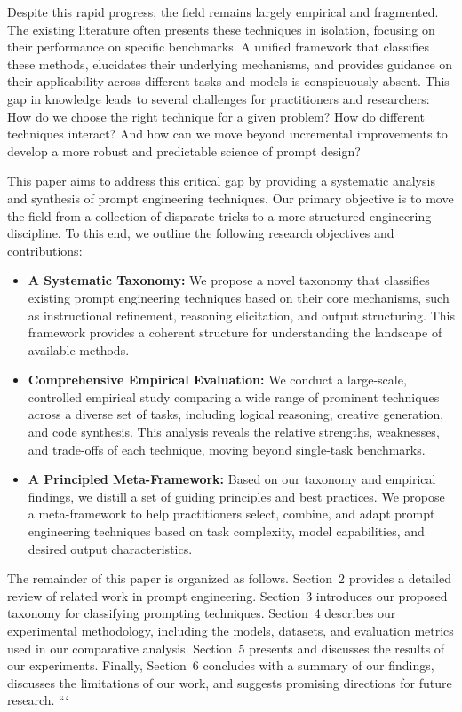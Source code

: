 \documentclass{article}
\begin{document}
Despite this rapid progress, the field remains largely empirical and fragmented. The existing literature often presents these techniques in isolation, focusing on their performance on specific benchmarks. A unified framework that classifies these methods, elucidates their underlying mechanisms, and provides guidance on their applicability across different tasks and models is conspicuously absent. This gap in knowledge leads to several challenges for practitioners and researchers: How do we choose the right technique for a given problem? How do different techniques interact? And how can we move beyond incremental improvements to develop a more robust and predictable science of prompt design?

This paper aims to address this critical gap by providing a systematic analysis and synthesis of prompt engineering techniques. Our primary objective is to move the field from a collection of disparate tricks to a more structured engineering discipline. To this end, we outline the following research objectives and contributions:

\begin{itemize}
    \item \textbf{A Systematic Taxonomy:} We propose a novel taxonomy that classifies existing prompt engineering techniques based on their core mechanisms, such as instructional refinement, reasoning elicitation, and output structuring. This framework provides a coherent structure for understanding the landscape of available methods.
    \item \textbf{Comprehensive Empirical Evaluation:} We conduct a large-scale, controlled empirical study comparing a wide range of prominent techniques across a diverse set of tasks, including logical reasoning, creative generation, and code synthesis. This analysis reveals the relative strengths, weaknesses, and trade-offs of each technique, moving beyond single-task benchmarks.
    \item \textbf{A Principled Meta-Framework:} Based on our taxonomy and empirical findings, we distill a set of guiding principles and best practices. We propose a meta-framework to help practitioners select, combine, and adapt prompt engineering techniques based on task complexity, model capabilities, and desired output characteristics.
\end{itemize}

The remainder of this paper is organized as follows. Section~2 provides a detailed review of related work in prompt engineering. Section~3 introduces our proposed taxonomy for classifying prompting techniques. Section~4 describes our experimental methodology, including the models, datasets, and evaluation metrics used in our comparative analysis. Section~5 presents and discusses the results of our experiments. Finally, Section~6 concludes with a summary of our findings, discusses the limitations of our work, and suggests promising directions for future research.
```
\end{document}
